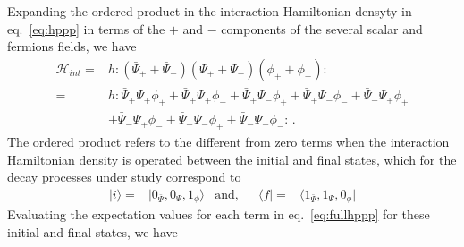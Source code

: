 Expanding the ordered product in the interaction Hamiltonian-densyty in eq.~\eqref{eq:hppp} in terms of the  $+$ and $-$ components of the several scalar and fermions fields, we have
\begin{align}
\label{eq:fullhppp}
 \mathcal{H}_{int}=&h:\left( \bar{\Psi}_{+}+\bar{\Psi}_{-}\right) \left( \Psi_{+}+\Psi_{-}\right) \left( \phi_{+}+\phi_{-}\right):\nonumber\\
=&h:
\bar{\Psi}_{+}\Psi_{+}\phi_{+}+ 
\bar{\Psi}_{+}\Psi_{+}\phi_{-}+ 
\bar{\Psi}_{+}\Psi_{-}\phi_{+}+ 
\bar{\Psi}_{+}\Psi_{-}\phi_{-}+ 
\bar{\Psi}_{-}\Psi_{+}\phi_{+}\nonumber\\ 
&+\bar{\Psi}_{-}\Psi_{+}\phi_{-}+ 
\bar{\Psi}_{-}\Psi_{-}\phi_{+}+ 
\bar{\Psi}_{-}\Psi_{-}\phi_{-} 
:\,.
\end{align}
The ordered product refers to the different from zero terms when the interaction Hamiltonian density is operated between the initial and final states, which for the decay processes under study correspond to
\begin{align}
  |i\rangle=&|0_{\bar{\Psi}},0_{\Psi},1_{\phi}\rangle & \text{and,} && \langle f|=&\langle 1_{\bar{\Psi}},1_{\Psi},0_\phi|
\end{align}
Evaluating the expectation values for each term in eq.~\eqref{eq:fullhppp} for these initial and final states, we have
